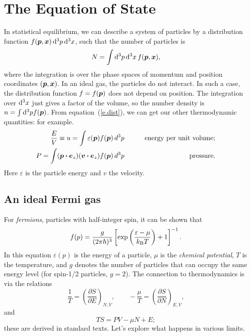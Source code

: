 \chapter[Equation of State]{The Equation of State}\label{ch.equation-of-state}

In statistical equilibrium, we can describe a system of particles by a distribution function $f(\boldsymbol{p},\boldsymbol{x})\,\mathrm{d}^{3}p\,\mathrm{d}^{3}x$, such that the number of particles is
\begin{equation}\label{e.dist}
N = \int \mathrm{d}^{3}p\,\mathrm{d}^{3}x\, f(\boldsymbol{p},\boldsymbol{x}),
\end{equation}
where the integration is over the phase spaces of momentum and position coordinates $(\boldsymbol{p},\boldsymbol{x})$. In an ideal gas, the particles do not interact. In such a case, the distribution function $f = f(\boldsymbol{p})$ does not depend on position.  The integration over $\mathrm{d}^{3}x$ just gives a factor of the volume, so the number density is $n = \int\mathrm{d}^{3}p f(\boldsymbol{p})$.  From equation~(\ref{e.dist}), we can get our other thermodynamic quantities: for example.
\begin{eqnarray}
\frac{E}{V} \equiv u = \int  \varepsilon(\boldsymbol{p}) f(\boldsymbol{p})\,d^{3}p &\qquad& \textrm{energy per unit volume;}\label{e.u}\\
P = \int  (\boldsymbol{p}\boldsymbol{\cdot} \boldsymbol{e}_{z} )(\boldsymbol{v}\boldsymbol{\cdot}\boldsymbol{e}_{z}) f(\boldsymbol{p})\,d^{3}p &\qquad& \textrm{pressure}.\label{e.P}
\end{eqnarray}
Here $\varepsilon$ is the particle energy and $v$ the velocity.

\section{An ideal Fermi gas}

For \emph{fermions}, particles with half-integer spin, it can be shown that
\begin{equation}\label{e.fermion}
f(p) = \frac{g}{(2\pi\hbar)^{3}} \left[\exp\left(\frac{\varepsilon-\mu}{k_\mathrm{B} T}\right)+1\right]^{-1}.
\end{equation}
In this equation $\varepsilon(p)$ is the energy of a particle, $\mu$ is the \emph{chemical potential}, $T$ is the temperature, and $g$ denotes the number of particles that can occupy the same energy level (for spin-1/2 particles, $g=2$).  The connection to thermodynamics is via the relations
\[
\frac{1}{T} = \left(\frac{\partial S}{\partial E}\right)_{N,V},\qquad -\frac{\mu}{T} = \left(\frac{\partial S}{\partial N}\right)_{E,V},
\]
and 
\[
TS = PV - \mu N + E;
\]
these are derived in standard texts. Let's explore what happens in various limits.  

